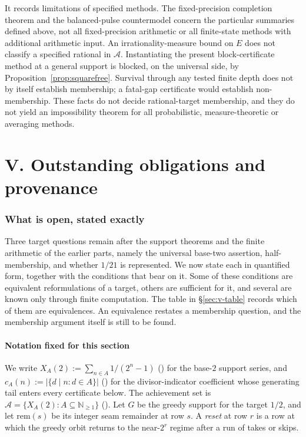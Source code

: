 It records limitations of specified methods.  The fixed-precision
completion theorem and the balanced-pulse countermodel concern the
particular summaries defined above, not all fixed-precision arithmetic
or all finite-state methods with additional arithmetic input. An
irrationality-measure bound on $E$ does not classify a specified rational in $\mathcal{A}$.
Instantiating the present block-certificate method at a general support is blocked, on the
universal side, by Proposition~\ref{prop:squarefree}. Survival through any tested finite depth does
not by itself establish membership; a fatal-gap certificate would establish non-membership. These
facts do not decide rational-target membership, and they do not yield an impossibility theorem for
all probabilistic, measure-theoretic or averaging methods.
\clearpage
\part*{V. Outstanding obligations and provenance}
\section{What is open, stated exactly}
Three target questions remain after the support theorems and the finite
arithmetic of the earlier parts, namely the universal base-two assertion,
half-membership, and whether $1/21$ is represented. We now
state each in quantified form, together with the conditions that bear on
it. Some of these conditions are equivalent reformulations of a target,
others are sufficient for it, and several are known only through finite
computation. The table in \S\ref{sec:v-table} records which of them are
equivalences. An equivalence restates a membership question, and the
membership argument itself is still to be found.

\subsection{Notation fixed for this section}

We write
$X_{A}(2) := \sum_{n\in A} 1/(2^n-1)$
() for the base-$2$ support series, and
$c_{A}(n) :=
|\{d\mid n : d\in A\}|$ () for the divisor-indicator
coefficient whose generating tail enters every certificate below.
The achievement set is
$\mathcal{A}=\{X_A(2):A\subseteq\mathbb N_{\ge1}\}$
().
Let $G$ be the greedy support for the target $1/2$, and let
$\mathrm{rem}(s)$ be its integer seam
remainder at row $s$. A \emph{reset} at row $r$ is a row at which the greedy orbit returns to the
near-$2^r$ regime after a run of takes or skips.

